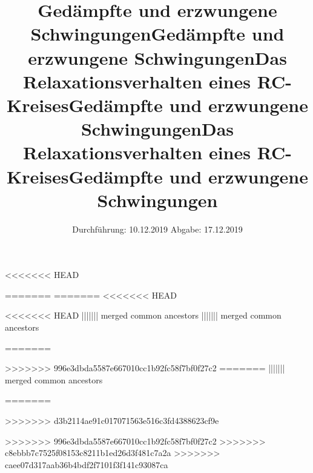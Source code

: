 

\subject{Versuch 354}
<<<<<<< HEAD
\title{Gedämpfte und erzwungene Schwingungen}
=======
=======
<<<<<<< HEAD
\subject{Versuch 354}
\title{Gedämpfte und erzwungene Schwingungen}
<<<<<<< HEAD
||||||| merged common ancestors
||||||| merged common ancestors
\subject{Versuch 353}
\title{Das Relaxationsverhalten eines RC-Kreises}
=======
\subject{Versuch 353}
\title{Gedämpfte und erzwungene Schwingungen}
>>>>>>> 996e3dbda5587e667010cc1b92fc58f7bf0f27c2
=======
||||||| merged common ancestors
\subject{Versuch 353}
\title{Das Relaxationsverhalten eines RC-Kreises}
=======
\subject{Versuch 353}
>>>>>>> d3b2114ae91c017071563e516c3fd4388623cf9e
\title{Gedämpfte und erzwungene Schwingungen}
>>>>>>> 996e3dbda5587e667010cc1b92fc58f7bf0f27c2
>>>>>>> c8ebbb7c7525f08153c8211b1ed26d3f481c7a2a
>>>>>>> caee07d317aab36b4bdf2f7101f3f141c93087ca
\date{%
  Durchführung: 10.12.2019
  \hspace{3em}
  Abgabe: 17.12.2019
}



\maketitle
\thispagestyle{empty}
\tableofcontents
\newpage






\nocite{*}
\printbibliography{}


